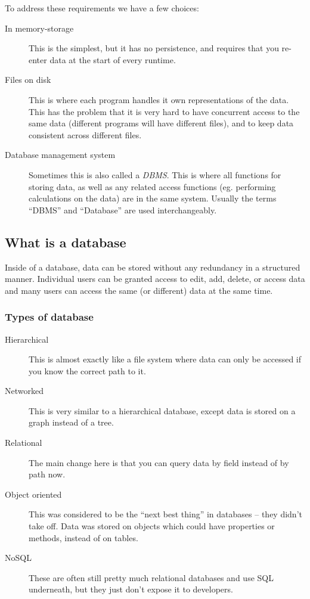 To address these requirements we have a few choices:
\begin{description}
    \item[In memory-storage] This is the simplest, but it has no persistence, and requires that you re-enter data at the start of every runtime.
        \item[Files on disk] This is where each program handles it own representations of the data.
            This has the problem that it is very hard to have concurrent access to the same data (different programs will have different files), and to keep data consistent across different files.
            \item[Database management system] Sometimes this is also called a \emph{DBMS}.
                This is where all functions for storing data, as well as any related access functions (eg. performing calculations on the data) are in the same system.
                Usually the terms ``DBMS'' and ``Database'' are used interchangeably.
        \end{description}

\subsection{What is a database}\label{sub:what_is_a_database}

Inside of a database, data can be stored without any redundancy in a structured manner.
Individual users can be granted access to edit, add, delete, or access data and many users can access the same (or different) data at the same time.

\subsubsection{Types of database}\label{ssub:types_of_database}

\begin{description}
    \item[Hierarchical] This is almost exactly like a file system where data can only be accessed if you know the correct path to it.
        \item[Networked] This is very similar to a hierarchical database, except data is stored on a graph instead of a tree.
            \item[Relational] The main change here is that you can query data by field instead of by path now.
                \item[Object oriented] This was considered to be the ``next best thing'' in databases -- they didn't take off.
                    Data was stored on objects which could have properties or methods, instead of on tables.
                    \item[NoSQL] These are often still pretty much relational databases and use SQL underneath, but they just don't expose it to developers.
            \end{description}

